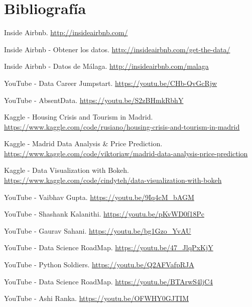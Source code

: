 \section{Bibliografía}
\begin{thebibliography}{9}
Inside Airbnb.
\href{http://insideairbnb.com/}{http://insideairbnb.com/}

Inside Airbnb - Obtener los datos.
\href{http://insideairbnb.com/get-the-data/}{http://insideairbnb.com/get-the-data/}

Inside Airbnb - Datos de Málaga.
\href{http://insideairbnb.com/malaga}{http://insideairbnb.com/malaga}

YouTube - Data Career Jumpstart.
\href{https://www.youtube.com/watch?v=CHb-QvGcRjw&t=325s&ab_channel=AverySmith-DataCareerJumpstart}{https://youtu.be/CHb-QvGcRjw}

YouTube - AbsentData.
\href{https://www.youtube.com/watch?v=S2zBHmkRbhY&ab_channel=AbsentData}{https://youtu.be/S2zBHmkRbhY}

Kaggle - Housing Crisis and Tourism in Madrid.
\href{https://www.kaggle.com/code/rusiano/housing-crisis-and-tourism-in-madrid}{https://www.kaggle.com/code/rusiano/housing-crisis-and-tourism-in-madrid}

Kaggle - Madrid Data Analysis \& Price Prediction.
\href{https://www.kaggle.com/code/viktoriaw/madrid-data-analysis-price-prediction}{https://www.kaggle.com/code/viktoriaw/madrid-data-analysis-price-prediction}

Kaggle - Data Visualization with Bokeh.
\href{https://www.kaggle.com/code/cindyteh/data-visualization-with-bokeh}{https://www.kaggle.com/code/cindyteh/data-visualization-with-bokeh}

YouTube - Vaibhav Gupta.
\href{https://www.youtube.com/watch?v=9Iq4cM_bAGM&ab_channel=VaibhavGupta}{https://youtu.be/9Iq4cM\_bAGM}

YouTube - Shashank Kalanithi.
\href{https://www.youtube.com/watch?v=pKvWD0f18Pc&ab_channel=ShashankKalanithi}{https://youtu.be/pKvWD0f18Pc}

YouTube - Gaurav Sahani.
\href{https://www.youtube.com/watch?v=bg1Gzo_YvAU&ab_channel=GauravSahani}{https://youtu.be/bg1Gzo\_YvAU}

YouTube - Data Science RoadMap.
\href{https://www.youtube.com/watch?v=47_JlqPxKjY&ab_channel=DataScienceRoadMap}{https://youtu.be/47\_JlqPxKjY}

YouTube - Python Soldiers.
\href{https://www.youtube.com/watch?v=Q2AFVafpRJA&t=776s&ab_channel=PythonSoldiers}{https://youtu.be/Q2AFVafpRJA}

YouTube - Data Science RoadMap.
\href{https://www.youtube.com/watch?v=BTArwS4ljC4&t=61s&ab_channel=DataScienceRoadMap}{https://youtu.be/BTArwS4ljC4}

YouTube - Ashi Ranka.
\href{https://www.youtube.com/watch?v=OFWHY0GJTIM&ab_channel=AshiRanka}{https://youtu.be/OFWHY0GJTIM}

\end{thebibliography}